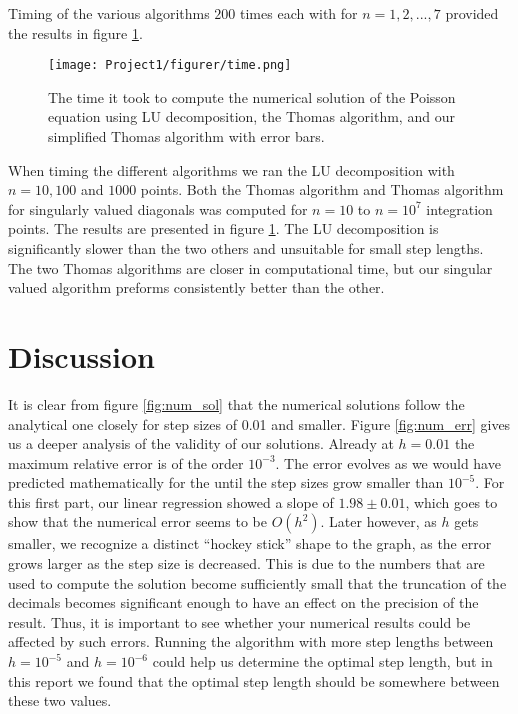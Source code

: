 \documentclass[english]{article}
\begin{document}
Timing of the various algorithms $200$ times each with for $n=1, 2, ..., 7$ provided the results in figure \ref{fig:time}.
\begin{figure} [H]
    \centering
    \texttt{[image: Project1/figurer/time.png]}
    \caption{The time it took to compute the numerical solution of the Poisson equation using LU decomposition, the Thomas algorithm, and our simplified Thomas algorithm with error bars. }
    \label{fig:time}
\end{figure}
When timing the different algorithms we ran the LU decomposition with $n = 10, 100$ and $1000$ points. Both the Thomas algorithm and Thomas algorithm for singularly valued diagonals was computed for $n = 10$ to $n = 10^7$ integration points. The results are presented in figure \ref{fig:time}. The LU decomposition is significantly slower than the two others and unsuitable for small step lengths. The two Thomas algorithms are closer in computational time, but our singular valued algorithm preforms consistently better than the other. 



\section{Discussion}
It is clear from figure \ref{fig:num_sol} that the numerical solutions follow the analytical one closely for step sizes of 0.01 and smaller. Figure \ref{fig:num_err} gives us a deeper analysis of the validity of our solutions. Already at $h=0.01$ the maximum relative error is of the order $10^{-3}$. The error evolves as we would have predicted mathematically for the until the step sizes grow smaller than $10^{-5}$. For this first part, our linear regression showed a slope of $1.98 \pm 0.01$, which goes to show that the numerical error seems to be $O(h^2)$. Later however, as $h$ gets smaller, we recognize a distinct ``hockey stick'' shape to the graph, as the error grows larger as the step size is decreased. This is due to the numbers that are used to compute the solution become sufficiently small that the truncation of the decimals becomes significant enough to have an effect on the precision of the result. Thus, it is important to see whether your numerical results could be affected by such errors. Running the algorithm  with more step lengths between $h=10
^{-5}$ and $h=10^{-6}$ could help us determine the optimal step length, but in this report we found that the optimal step length should be somewhere between these two values.
\end{document}
